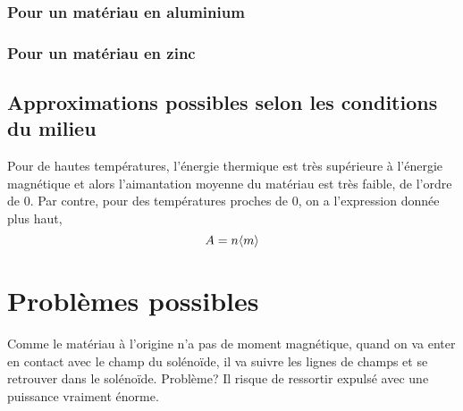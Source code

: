 \documentclass{article}
\begin{document}
\subsubsection{Pour un matériau en aluminium}


\subsubsection{Pour un matériau en zinc}


\subsection{Approximations possibles selon les conditions du milieu}
Pour de hautes températures, l'énergie thermique est très supérieure à l'énergie magnétique et alors l'aimantation moyenne du matériau est très faible, de l'ordre de 0. Par contre, pour des températures proches de 0, on a l'expression donnée plus haut, $$A = n \valmoy{m}$$

\section{Problèmes possibles}
Comme le matériau à l'origine n'a pas de moment magnétique, quand on va enter en contact avec le champ du solénoïde, il va suivre les lignes de champs et se retrouver dans le solénoïde. Problème? Il risque de ressortir expulsé avec une puissance vraiment énorme.
\end{document}
